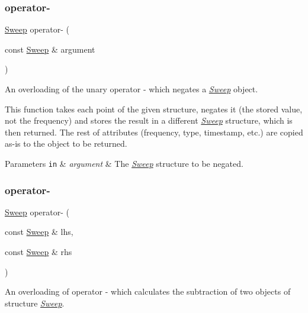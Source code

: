 \subsubsection{\texorpdfstring{operator-\/}{operator-}\hspace{0.1cm}{\footnotesize\ttfamily [1/3]}}
{\footnotesize\ttfamily \hyperlink{structSweep}{Sweep} operator-\/ (\begin{DoxyParamCaption}\item[{const \hyperlink{structSweep}{Sweep} \&}]{argument }\end{DoxyParamCaption})\hspace{0.3cm}{\ttfamily [friend]}}



An overloading of the unary operator -\/ which negates a {\itshape \hyperlink{structSweep}{Sweep}} object. 

This function takes each point of the given structure, negates it (the stored value, not the frequency) and stores the result in a different {\itshape \hyperlink{structSweep}{Sweep}} structure, which is then returned. The rest of attributes (frequency, type, timestamp, etc.) are copied as-\/is to the object to be returned. 
\begin{DoxyParams}[1]{Parameters}
\mbox{\tt in}  & {\em argument} & The {\itshape \hyperlink{structSweep}{Sweep}} structure to be negated. \\
\hline
\end{DoxyParams}
\mbox{\label{structSweep_a8f704b31d015e4d81d25d3fceca1e2f1}} 
\subsubsection{\texorpdfstring{operator-\/}{operator-}\hspace{0.1cm}{\footnotesize\ttfamily [2/3]}}
{\footnotesize\ttfamily \hyperlink{structSweep}{Sweep} operator-\/ (\begin{DoxyParamCaption}\item[{const \hyperlink{structSweep}{Sweep} \&}]{lhs,  }\item[{const \hyperlink{structSweep}{Sweep} \&}]{rhs }\end{DoxyParamCaption})\hspace{0.3cm}{\ttfamily [friend]}}



An overloading of operator -\/ which calculates the subtraction of two objects of structure {\itshape \hyperlink{structSweep}{Sweep}}. 

